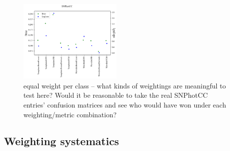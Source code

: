 \begin{figure}
	\begin{center}
		\includegraphics[width=0.45\textwidth]{./fig/SNPhotCC_res.png}
		\caption{equal weight per class -- what kinds of weightings are meaningful to test here?  Would it be reasonable to take the real SNPhotCC entries' confusion matrices and see who would have won under each weighting/metric combination?}
		\label{fig:real_metric_compare}
	\end{center}
\end{figure}

\subsection{Weighting systematics}
\label{sec:weight_res}

